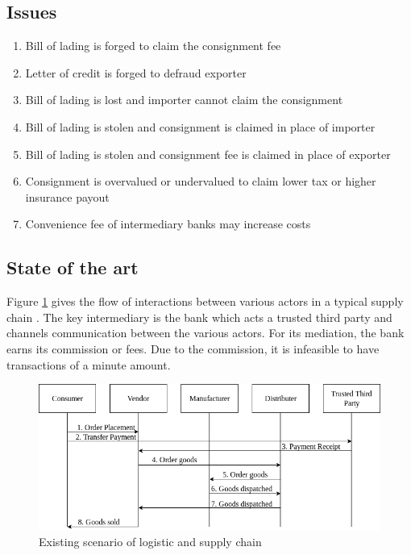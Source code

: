 \documentclass[num-refs]{wiley-article}
\begin{document}
\subsection{Issues} \label{issues}
\begin{enumerate}
    \item Bill of lading is forged to claim the consignment fee
    \item Letter of credit is forged to defraud exporter
    \item Bill of lading is lost and importer cannot claim the consignment
    \item Bill of lading is stolen and consignment is claimed in place of importer
    \item Bill of lading is stolen and consignment fee is claimed in place of exporter
    \item Consignment is overvalued or undervalued to claim lower tax or higher insurance payout
    \item Convenience fee of intermediary banks may increase costs
\end{enumerate}

\subsection{State of the art}
Figure \ref{diag-ex} gives the flow of interactions between various actors in a typical supply chain \cite{chang2019exploring}. The key intermediary is the bank which acts a trusted third party and channels communication between the various actors. For its mediation, the bank earns its commission or fees. Due to the commission, it is infeasible to have transactions of a minute amount.

\begin{figure}[!h]
\centering\includegraphics[width=0.8\linewidth]{first.png}
\caption{Existing scenario of logistic and supply chain}
\label{diag-ex}
\end{figure}
\end{document}
